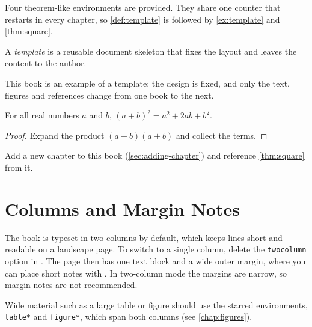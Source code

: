 Four theorem-like environments are provided. They share one counter that
restarts in every chapter, so \cref{def:template} is followed by
\cref{ex:template} and \cref{thm:square}.

\begin{definition}[Template]\label{def:template}
A \emph{template} is a reusable document skeleton that fixes the layout and
leaves the content to the author.
\end{definition}

\begin{example}\label{ex:template}
This book is an example of a template: the design is fixed, and only the
text, figures and references change from one book to the next.
\end{example}

\begin{theorem}\label{thm:square}
For all real numbers $a$ and $b$, $(a+b)^2 = a^2 + 2ab + b^2$.
\end{theorem}

\begin{proof}
Expand the product $(a+b)(a+b)$ and collect the terms.
\end{proof}

\begin{exercise}\label{ex:practice}
Add a new chapter to this book (\cref{sec:adding-chapter}) and reference
\cref{thm:square} from it.
\end{exercise}

\section{Columns and Margin Notes}\label{sec:layout}

The book is typeset in two columns by default, which keeps lines short and
readable on a landscape page. To switch to a single column, delete the
\texttt{twocolumn} option in . The page then has one text block
and a wide outer margin, where you can place short notes with
. In two-column mode the margins are narrow, so margin notes
are not recommended.

\begin{note}
Wide material such as a large table or figure should use the starred
environments, \texttt{table*} and \texttt{figure*}, which span both columns
(see \cref{chap:figures}).
\end{note}
